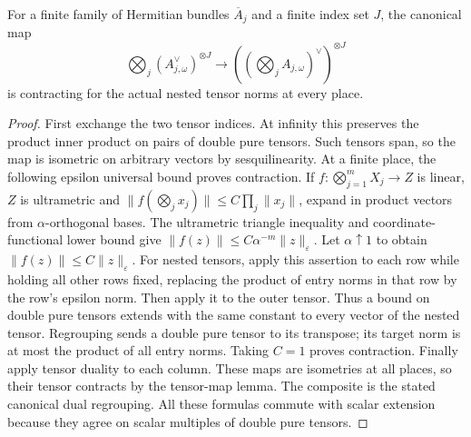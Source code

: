 \begin{lemma}
\label{lem:contraction-dual-regroup}
\leanok
For a finite family of Hermitian bundles $\overline A_j$ and a finite index
set $J$, the canonical map
\[
 \bigotimes_j(A_{j,\omega}^\vee)^{\otimes J}
 \longrightarrow ((\bigotimes_j A_{j,\omega})^\vee)^{\otimes J}
\]
is contracting for the actual nested tensor norms at every place.
\end{lemma}
\begin{proof}
First exchange the two tensor indices. At infinity this preserves the product
inner product on pairs of double pure tensors. Such tensors span, so the
map is isometric on arbitrary vectors by sesquilinearity.
At a finite place, the following epsilon universal bound proves contraction.
If $f:\bigotimes_{j=1}^m X_j\to Z$ is linear, $Z$ is ultrametric and
$\|f(\bigotimes_jx_j)\|\leq C\prod_j\|x_j\|$, expand in product
vectors from $\alpha$-orthogonal bases. The ultrametric triangle inequality
and coordinate-functional lower bound give
$\|f(z)\|\leq C\alpha^{-m}\|z\|_\varepsilon$.
Let $\alpha\uparrow1$ to obtain $\|f(z)\|\leq C\|z\|_\varepsilon$.
For nested tensors, apply this assertion to each row while holding all other
rows fixed, replacing the product of entry norms in that row by the row's
epsilon norm. Then apply it to the outer tensor. Thus a bound on double pure
tensors extends with the same constant to every vector of the nested tensor.
Regrouping sends a double pure tensor to its transpose; its target norm is
at most the product of all entry norms. Taking $C=1$ proves contraction.
Finally apply tensor duality to each column. These maps are isometries at all
places, so their tensor contracts by the tensor-map lemma. The composite is
the stated canonical dual regrouping. All these formulas commute with scalar
extension because they agree on scalar multiples of double pure tensors.
\end{proof}

